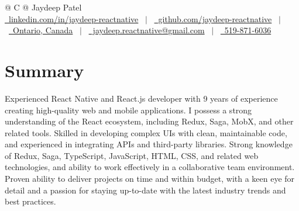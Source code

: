 \documentclass[a4paper,12pt]{article}
\begin{document}
\pagestyle{empty}


\begin{tabularx}{\linewidth}{@{} C @{}}
\Huge{Jaydeep Patel} \\[7.5pt]
\href{https://linkedin.com/in/jaydeep-reactnative}
{\raisebox{-0.05\height}\faLinkedin\ linkedin.com/in/jaydeep-reactnative}
\ $|$ \
\href{https://github.com/jaydeep-reactnative}
{\raisebox{-0.05\height}\faGithub\ github.com/jaydeep-reactnative}
\ $|$ \
\href{https://maps.app.goo.gl/799Fo5EQh1tyS8936}
{\raisebox{-0.05\height}\faMapMarker\ Ontario, Canada}
\ $|$ \
\href{mailto:jaydeep.reactnative@gmail.com}
{\raisebox{-0.05\height}\faEnvelope\ jaydeep.reactnative@gmail.com}
\ $|$ \
\href{tel:5198716036}
{\raisebox{-0.05\height}\faMobile\ 519-871-6036} \\
\end{tabularx}


\section{Summary}
Experienced React Native and React.js developer with 9 years of experience creating high-quality web and mobile applications. I possess a strong understanding of the React ecosystem, including Redux, Saga, MobX, and other related tools. Skilled in developing complex UIs with clean, maintainable code, and experienced in integrating APIs and third-party libraries. Strong knowledge of Redux, Saga, TypeScript, JavaScript, HTML, CSS, and related web technologies, and ability to work effectively in a collaborative team environment. Proven ability to deliver projects on time and within budget, with a keen eye for detail and a passion for staying up-to-date with the latest industry trends and best practices.

\end{document}
